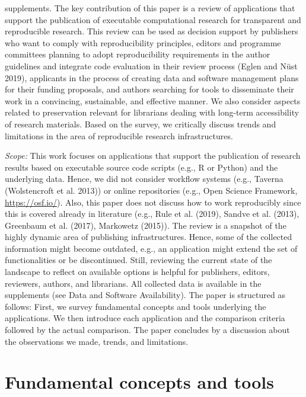 \documentclass[onecolumn]{article}
\begin{document}
supplements. The key contribution of this paper is a review of
applications that support the publication of executable computational
research for transparent and reproducible research. This review can be
used as decision support by publishers who want to comply with
reproducibility principles, editors and programme committees planning to
adopt reproducibility requirements in the author guidelines and
integrate code evaluation in their review process (Eglen and Nüst 2019),
applicants in the process of creating data and software management plans
for their funding proposals, and authors searching for tools to
disseminate their work in a convincing, sustainable, and effective
manner. We also consider aspects related to preservation relevant for
librarians dealing with long-term accessibility of research materials.
Based on the survey, we critically discuss trends and limitations in the
area of reproducible research infrastructures.

\emph{Scope:} This work focuses on applications that support the
publication of research results based on executable source code scripts
(e.g., R or Python) and the underlying data. Hence, we did not consider
workflow systems (e.g., Taverna (Wolstencroft et al. 2013)) or online
repositories (e.g., Open Science Framework, \url{https://osf.io/}).
Also, this paper does not discuss how to work reproducibly since this is
covered already in literature (e.g., Rule et al. (2019), Sandve et al.
(2013), Greenbaum et al. (2017), Markowetz (2015)). The review is a
snapshot of the highly dynamic area of publishing infrastructures.
Hence, some of the collected information might become outdated, e.g., an
application might extend the set of functionalities or be discontinued.
Still, reviewing the current state of the landscape to reflect on
available options is helpful for publishers, editors, reviewers,
authors, and librarians. All collected data is available in the
supplements (see Data and Software Availability). The paper is
structured as follows: First, we survey fundamental concepts and tools
underlying the applications. We then introduce each application and the
comparison criteria followed by the actual comparison. The paper
concludes by a discussion about the observations we made, trends, and
limitations.

\hypertarget{fundamental-concepts-and-tools}{%
\section{Fundamental concepts and
tools}\label{fundamental-concepts-and-tools}}
\end{document}
